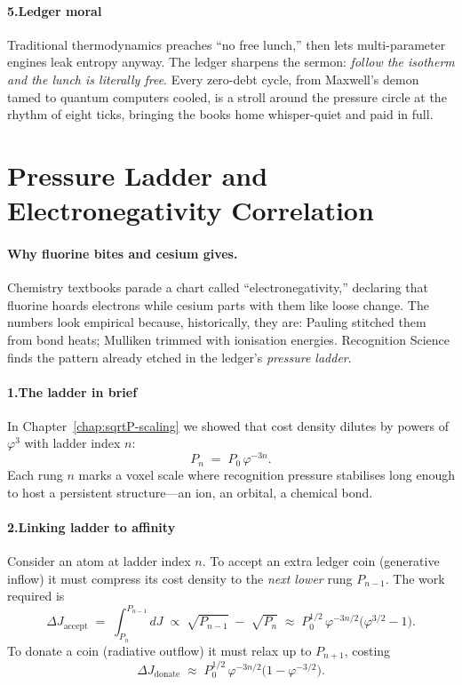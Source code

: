 \documentclass[11pt,oneside]{book}
\begin{document}
\paragraph*{5.\;Ledger moral}

Traditional thermodynamics preaches “no free lunch,” then lets
multi-parameter engines leak entropy anyway.  
The ledger sharpens the sermon: \emph{follow the isotherm and the lunch
is literally free}.  
Every zero-debt cycle, from Maxwell’s demon tamed to quantum computers
cooled, is a stroll around the pressure circle at the rhythm of eight
ticks, bringing the books home whisper-quiet and paid in full.

\section{Pressure Ladder and Electronegativity Correlation}
\label{sec:pressure-electronegativity}

\paragraph*{Why fluorine bites and cesium gives.}
Chemistry textbooks parade a chart called “electronegativity,” declaring that fluorine hoards electrons while cesium parts with them like loose change.  
The numbers look empirical because, historically, they are: Pauling stitched them from bond heats; Mulliken trimmed with ionisation energies.  
Recognition Science finds the pattern already etched in the ledger’s \emph{pressure ladder}.  

\paragraph*{1.\;The ladder in brief}

In Chapter~\ref{chap:sqrtP-scaling} we showed that cost density dilutes by powers of $\varphi^{3}$ with ladder index $n$:
\[
  P_{n} \;=\; P_{0}\,\varphi^{-3n}.
\]
Each rung $n$ marks a voxel scale where recognition pressure stabilises long enough to host a persistent structure—an ion, an orbital, a chemical bond.

\paragraph*{2.\;Linking ladder to affinity}

Consider an atom at ladder index $n$.  
To accept an extra ledger coin (generative inflow) it must compress its cost density to the \emph{next lower} rung $P_{n-1}$.  
The work required is
\[
  \Delta J_{\text{accept}}
  \;=\;
  \int_{P_{n}}^{P_{n-1}}\!\!dJ
  \;\propto\;
  \sqrt{P_{n-1}}\;-\;\sqrt{P_{n}}
  \;\approx\;
  P_{0}^{1/2}\,\varphi^{-3n/2}\bigl(\varphi^{3/2}-1\bigr).
\]
To donate a coin (radiative outflow) it must relax up to $P_{n+1}$,
costing
\[
  \Delta J_{\text{donate}}
  \;\approx\;
  P_{0}^{1/2}\,\varphi^{-3n/2}\bigl(1-\varphi^{-3/2}\bigr).
\]
\end{document}
